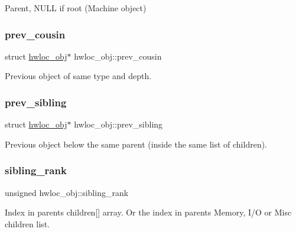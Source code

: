 Parent, {\ttfamily N\+U\+LL} if root (Machine object) 

\mbox{\label{a00238_ac715989f55ff5a0eb6be2969ee477ec0}} 
\subsubsection{\texorpdfstring{prev\+\_\+cousin}{prev\_cousin}}
{\footnotesize\ttfamily struct \hyperlink{a00238}{hwloc\+\_\+obj}$\ast$ hwloc\+\_\+obj\+::prev\+\_\+cousin}



Previous object of same type and depth. 

\mbox{\label{a00238_a7b89e8c189876c0158a9282aaaf17f50}} 
\subsubsection{\texorpdfstring{prev\+\_\+sibling}{prev\_sibling}}
{\footnotesize\ttfamily struct \hyperlink{a00238}{hwloc\+\_\+obj}$\ast$ hwloc\+\_\+obj\+::prev\+\_\+sibling}



Previous object below the same parent (inside the same list of children). 

\mbox{\label{a00238_aaa6043eee6f55869933c1d974efd9acd}} 
\subsubsection{\texorpdfstring{sibling\+\_\+rank}{sibling\_rank}}
{\footnotesize\ttfamily unsigned hwloc\+\_\+obj\+::sibling\+\_\+rank}



Index in parent\textquotesingle{}s {\ttfamily children}\mbox{[}\mbox{]} array. Or the index in parent\textquotesingle{}s Memory, I/O or Misc children list. 

\mbox{\label{a00238_a5d4f97e76723a9ec8d38046f19e00d33}} 
